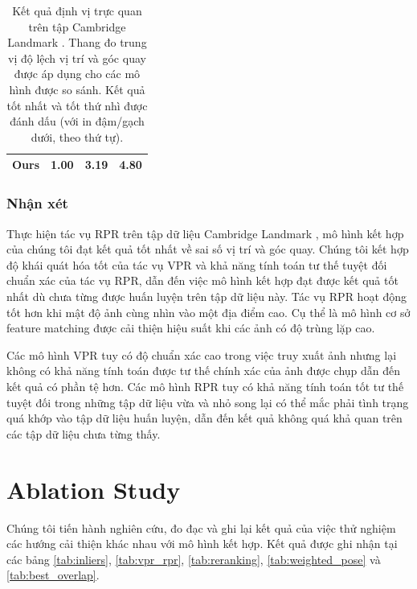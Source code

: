 \begin{table}
\begin{tabular}{|l|c|c|c|}
        Ours                                   & 1.00                                                                & \textbf{3.19}                                                            & \textbf{4.80}                                                                 \\ \hline
    \end{tabular}
    \vspace{10pt}
    \caption[Kết quả định vị trực quan trên tập Cambridge Landmark]{Kết quả định vị trực quan trên tập Cambridge Landmark \cite{kendall2016posenet}. Thang đo trung vị độ lệch vị trí và góc quay được áp dụng cho các mô hình được so sánh. Kết quả tốt nhất và tốt thứ nhì được đánh dấu (với in đậm/gạch dưới, theo thứ tự).}
    \label{tab:cambridge_vpr_comparison}
\end{table}
\egroup

\subsubsection*{Nhận xét}
Thực hiện tác vụ RPR trên tập dữ liệu Cambridge Landmark \cite{kendall2016posenet}, mô hình kết hợp của chúng tôi đạt kết quả tốt nhất về sai số vị trí và góc quay. Chúng tôi kết hợp độ khái quát hóa tốt của tác vụ VPR và khả năng tính toán tư thế tuyệt đối chuẩn xác của tác vụ RPR, dẫn đến việc mô hình kết hợp đạt được kết quả tốt nhất dù chưa từng được huấn luyện trên tập dữ liệu này. Tác vụ RPR hoạt động tốt hơn khi mật độ ảnh cùng nhìn vào một địa điểm cao. Cụ thể là mô hình cơ sở feature matching được cải thiện hiệu suất khi các ảnh có độ trùng lặp cao.

Các mô hình VPR tuy có độ chuẩn xác cao trong việc truy xuất ảnh nhưng lại không có khả năng tính toán được tư thế chính xác của ảnh được chụp dẫn đến kết quả có phần tệ hơn. Các mô hình RPR tuy có khả năng tính toán tốt tư thế tuyệt đối trong những tập dữ liệu vừa và nhỏ song lại có thể mắc phải tình trạng quá khớp vào tập dữ liệu huấn luyện, dẫn đến kết quả không quá khả quan trên các tập dữ liệu chưa từng thấy.

\section{Ablation Study}
Chúng tôi tiến hành nghiên cứu, đo đạc và ghi lại kết quả của việc thử nghiệm các hướng cải thiện khác nhau với mô hình kết hợp. Kết quả được ghi nhận tại các bảng \ref{tab:inliers}, \ref{tab:vpr_rpr}, \ref{tab:reranking}, \ref{tab:weighted_pose} và \ref{tab:best_overlap}.

